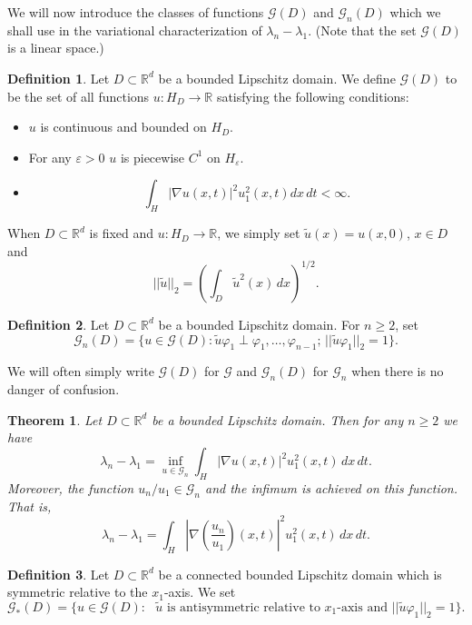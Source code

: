 \documentclass[11pt,leqno]{article}
\newtheorem{thm}{Theorem}[section]
\theoremstyle{definition}
\newtheorem{defn}{Definition}[section]
\newcommand{\Rd}{\mathbb{R}^d}
\newcommand{\R}{\mathbb{R}}
\newcommand{\eps}{\varepsilon}
\numberwithin{equation}{section}
\begin{document}
We will now introduce the classes of functions $\mathcal{G}(D)$ and $\mathcal{G}_n(D)$
 which we shall use in the variational characterization of $\lambda_n - \lambda_1$. (Note that the set
$\mathcal{G}(D)$ is a linear space.)

\begin{defn}
\label{classG}
Let $D \subset \Rd$ be a bounded Lipschitz domain. We define $\mathcal{G}(D)$ to
 be the set of all functions $u:H_D \to \R$ satisfying the following conditions:
\begin{itemize}
\item[(i)] $u$ is continuous and bounded on $H_D$.

\item[(ii)] For any $\eps > 0$ $u$ is piecewise $C^1$ on $H_{\eps}$.

\item[(iii)]
$$
\int_{H} |\nabla u(x,t)|^2 u_1^2(x,t) dx \, dt < \infty.
$$
\end{itemize}
\end{defn}



When $D \subset \Rd$ is fixed and $u: H_D \to \R$,  we simply set  $\tilde{u}(x) = u(x,0)$, $x \in D$ and 
$$
||\tilde{u}||_2 = \left(\int_D \tilde{u}^2(x) \, dx \right)^{1/2}.
$$

\begin{defn}
\label{classGn}
Let  $D \subset \Rd$ be a bounded Lipschitz domain.  For $n\geq 2$, set 
$$
\mathcal{G}_n(D) = \{u \in \mathcal{G}(D): \tilde{u}\varphi_1 \perp \varphi_1, \ldots, \varphi_{n - 1}; \, ||\tilde{u}\varphi_1||_2 = 1 \}.
$$
\end{defn}
We will often simply write  $\mathcal{G}(D)$  for $\mathcal{G}$ 
and $\mathcal{G}_n(D)$ for $\mathcal{G}_n$
when there is no danger of confusion. 


\begin{thm}
\label{variationalf}
Let $D \subset \Rd$ be a bounded Lipschitz domain. Then for any  $n \ge 2$ we have
$$
\lambda_{n} - \lambda_{1} = \inf_{u \in \mathcal{G}_n} \int_{H} |\nabla 
u(x,t)|^{2} u_1^2(x,t) \, dx \, dt.
$$
Moreover, the function $u_n/u_1 \in \mathcal{G}_n$ and the infimum is achieved on this function. 
That is,  
$$
\lambda_{n} - \lambda_{1} =  \int_{H} 
\left|\nabla\left(\frac{u_n}{u_1}\right)(x,t)\right|^{2} u_1^2(x,t) \, dx \, dt.
$$
\end{thm}



\begin{defn}
\label{classG*}
Let $D \subset \Rd$ be a connected bounded Lipschitz domain which
 is symmetric relative to the $x_1$-axis. We set 
$$
\mathcal{G}_*(D) = \{u \in \mathcal{G}(D): \text{ $\tilde{u}$ is
 antisymmetric relative to $x_1$-axis and  $||\tilde{u}\varphi_1||_2 = 1$} \}.
$$
\end{defn}
\end{document}
